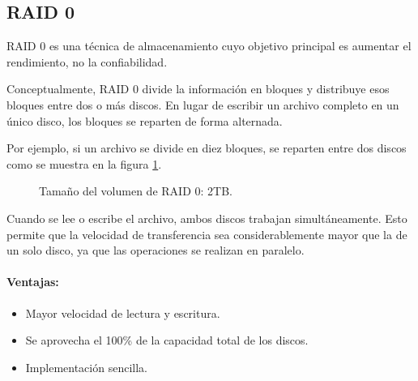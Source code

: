 \subsection{RAID 0}

RAID 0 es una técnica de almacenamiento cuyo objetivo principal es aumentar el rendimiento, no la confiabilidad.

Conceptualmente, RAID 0 divide la información en bloques y distribuye esos bloques entre dos o más discos. En lugar de escribir un archivo completo en un único disco, los bloques se reparten de forma alternada.

Por ejemplo, si un archivo se divide en diez bloques, se reparten entre dos discos como se muestra en la figura \ref{fig:raid0}.

\begin{figure}[!ht]
  \centering
  \caption{Tamaño del volumen de RAID 0: 2TB.}
  \label{fig:raid0}
\end{figure}

Cuando se lee o escribe el archivo, ambos discos trabajan simultáneamente. Esto permite que la velocidad de transferencia sea considerablemente mayor que la de un solo disco, ya que las operaciones se realizan en paralelo.

\paragraph{Ventajas:}
\begin{itemize}
  \item Mayor velocidad de lectura y escritura.
  \item Se aprovecha el 100\% de la capacidad total de los discos.
  \item Implementación sencilla.
\end{itemize}

